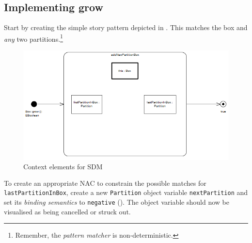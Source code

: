\newpage
\hypertarget{growBox vis}{}
\subsection{Implementing grow}
\genHeader

\begin{stepbystep}
 
\item Start by creating the simple story pattern depicted in . This matches the box and \emph{any} two
partitions.\footnote{Remember, the \emph{pattern matcher} is non-deterministic.}

\vspace{0.5cm}

\begin{figure}[htbp]
\begin{center}
  \includegraphics[width=\textwidth]{../../org.moflon.doc.handbook.03_storyDiagrams/08_growBox/visGBImages/ea_elementsGrowBox}
  \caption{Context elements for SDM}  
  \label{ea:sdm_growContext}
\end{center}
\end{figure}

\item To create an appropriate \mbox{NAC} to constrain the possible matches for \texttt{lastPartitionInBox},  create a new
\texttt{Partition} object variable \texttt{next\-Part\-ition} and set its \emph{binding semantics} to \texttt{negative} (). The object
variable should now be visualised as being cancelled or struck out.
 

\end{stepbystep}
